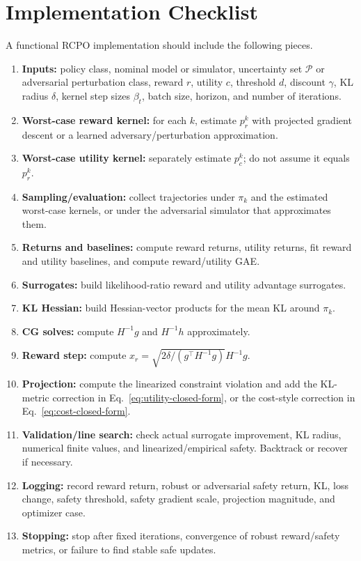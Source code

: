 \documentclass[11pt]{article}
\newcommand{\Pset}{\mathcal P}
\begin{document}
\section{Implementation Checklist}
A functional RCPO implementation should include the following pieces.

\begin{enumerate}[leftmargin=2em]
    \item \textbf{Inputs:} policy class, nominal model or simulator, uncertainty set $\Pset$ or adversarial perturbation class, reward $r$, utility $c$, threshold $d$, discount $\gamma$, KL radius $\delta$, kernel step sizes $\beta_t$, batch size, horizon, and number of iterations.
    \item \textbf{Worst-case reward kernel:} for each $k$, estimate $p_r^k$ with projected gradient descent or a learned adversary/perturbation approximation.
    \item \textbf{Worst-case utility kernel:} separately estimate $p_c^k$; do not assume it equals $p_r^k$.
    \item \textbf{Sampling/evaluation:} collect trajectories under $\pi_k$ and the estimated worst-case kernels, or under the adversarial simulator that approximates them.
    \item \textbf{Returns and baselines:} compute reward returns, utility returns, fit reward and utility baselines, and compute reward/utility GAE.
    \item \textbf{Surrogates:} build likelihood-ratio reward and utility advantage surrogates.
    \item \textbf{KL Hessian:} build Hessian-vector products for the mean KL around $\pi_k$.
    \item \textbf{CG solves:} compute $H^{-1}g$ and $H^{-1}h$ approximately.
    \item \textbf{Reward step:} compute $x_r=\sqrt{2\delta/(g^\top H^{-1}g)}H^{-1}g$.
    \item \textbf{Projection:} compute the linearized constraint violation and add the KL-metric correction in Eq.~\eqref{eq:utility-closed-form}, or the cost-style correction in Eq.~\eqref{eq:cost-closed-form}.
    \item \textbf{Validation/line search:} check actual surrogate improvement, KL radius, numerical finite values, and linearized/empirical safety.  Backtrack or recover if necessary.
    \item \textbf{Logging:} record reward return, robust or adversarial safety return, KL, loss change, safety threshold, safety gradient scale, projection magnitude, and optimizer case.
    \item \textbf{Stopping:} stop after fixed iterations, convergence of robust reward/safety metrics, or failure to find stable safe updates.
\end{enumerate}
\end{document}
